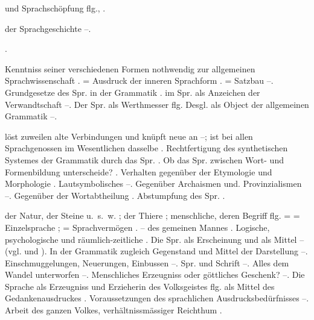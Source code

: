 \begin{register}
 und Sprachschöpfung \pageref{sp.308} flg., \pageref{sp.361}.

 der Sprachgeschichte \pageref{sp.255}–\pageref{sp.258}.

 \pageref{sp.276}.


 Kenntniss seiner verschiedenen Formen nothwendig zur allgemeinen Sprachwissenschaft \pageref{sp.50}. = Ausdruck der inneren Sprachform \pageref{sp.81}. = Satzbau \pageref{sp.81}–\pageref{sp.82}. Grundgesetze des Spr. in der Grammatik \pageref{sp.87}.  im Spr. als Anzeichen der Verwandtschaft \pageref{sp.149}–\pageref{sp.150}. Der Spr. als Werthmesser \pageref{sp.437} flg. Desgl. als Object der allgemeinen Grammatik \pageref{sp.479}–\pageref{sp.482}.

 löst zuweilen alte Verbindungen und knüpft neue an \pageref{sp.60}–\pageref{sp.61}; ist bei allen Sprachgenossen im Wesentlichen dasselbe \pageref{sp.64}. Rechtfertigung des synthetischen Systemes der Grammatik durch das Spr. \pageref{sp.97}. Ob das Spr. zwischen Wort- und Formenbildung unterscheide? \pageref{sp.122}. Verhalten gegenüber der Etymologie und Morphologie \pageref{sp.123}. Lautsymbolisches \pageref{sp.123}–\pageref{sp.124}. Gegenüber Archaismen und. Provinzialismen \pageref{sp.125}–\pageref{sp.127}. Gegenüber der Wortabtheilung \pageref{sp.132}.  Abstumpfung des Spr. \pageref{sp.275}.

 der Natur, der Steine u.~s.~w. \pageref{sp.2}; der Thiere \pageref{sp.2}; menschliche, deren Begriff \pageref{sp.3} flg. =   = Einzelsprache \pageref{sp.3}\sed{, \pageref{sp.8}}; = Sprachvermögen \pageref{sp.4}. – des gemeinen Mannes \pageref{sp.45}.  Logische, psychologische und räumlich-zeitliche  \pageref{sp.81}. Die Spr. als Erscheinung und als Mittel \pageref{sp.84}–\pageref{sp.85} (vgl.  und ). In der Grammatik zugleich Gegenstand und Mittel der Darstellung \pageref{sp.84}–\pageref{sp.85}. Einschmuggelungen, Neuerungen, Einbussen \pageref{sp.126}–\pageref{sp.127}. Spr. und Schrift \pageref{sp.127}–\pageref{sp.135}. Alles dem Wandel unterworfen \pageref{sp.168}–\pageref{sp.169}.  Menschliches Erzeugniss oder göttliches Geschenk? \pageref{sp.303}–\pageref{sp.304}. Die Sprache als Erzeugniss und Erzieherin des Volksgeistes \pageref{sp.387} flg.  als Mittel des Gedankenausdruckes \pageref{sp.429}. Voraussetzungen des sprachlichen Ausdrucksbedürfnisses \pageref{sp.437}–\pageref{sp.438}. Arbeit des  ganzen Volkes, verhältnissmässiger Reichthum \pageref{sp.470}.


\end{register}
